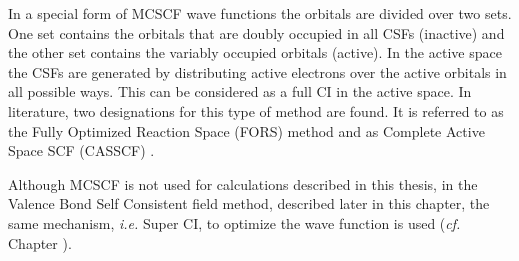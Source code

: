 In a special form of MCSCF wave functions the orbitals are divided over two sets. One set contains the orbitals that are doubly occupied in all CSFs (inactive) and the other set contains the variably occupied orbitals (active). In the active space the CSFs are generated by distributing active electrons over the active orbitals in all possible ways. This can be considered as a full CI in the active space. In literature, two designations for this type of method are found. It is referred to as the Fully Optimized Reaction Space (FORS) method \cite{fors1,fors2,fors3} and as Complete Active Space SCF (CASSCF) \cite{roos1,roos2}.

Although MCSCF is not used for calculations described in this thesis, in the Valence Bond Self Consistent field method, described later in this chapter, the same mechanism, \textit{i.e.} Super CI, to optimize the wave function is used (\textit{cf.} Chapter \chorbopt).

